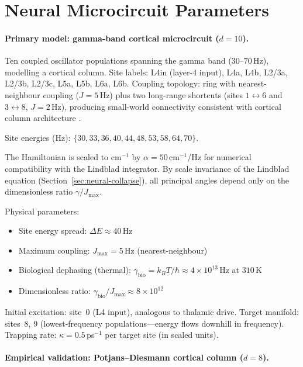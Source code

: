 \documentclass[12pt,a4paper]{article}
\theoremstyle{definition}
\theoremstyle{remark}
\begin{document}
\section{Neural Microcircuit Parameters}
\label{app:neural}

\paragraph{Primary model: gamma-band cortical microcircuit ($d = 10$).}

Ten coupled oscillator populations spanning the gamma band ($30$--$70$\,Hz), modelling a cortical column. Site labels: L4in (layer-4 input), L4a, L4b, L2/3a, L2/3b, L2/3c, L5a, L5b, L6a, L6b. Coupling topology: ring with nearest-neighbour coupling ($J = 5$\,Hz) plus two long-range shortcuts (sites $1 \leftrightarrow 6$ and $3 \leftrightarrow 8$, $J = 2$\,Hz), producing small-world connectivity consistent with cortical column architecture \cite{buzsaki2012mechanisms}.

Site energies (Hz): $\{30, 33, 36, 40, 44, 48, 53, 58, 64, 70\}$.

The Hamiltonian is scaled to cm$^{-1}$ by $\alpha = 50$\,cm$^{-1}$/Hz for numerical compatibility with the Lindblad integrator. By scale invariance of the Lindblad equation (Section~\ref{sec:neural-collapse}), all principal angles depend only on the dimensionless ratio $\gamma/J_{\max}$.

Physical parameters:
\begin{itemize}
\item Site energy spread: $\Delta E \approx 40$\,Hz
\item Maximum coupling: $J_{\max} = 5$\,Hz (nearest-neighbour)
\item Biological dephasing (thermal): $\gamma_{\mathrm{bio}} = k_BT/\hbar \approx 4 \times 10^{13}$\,Hz at $310$\,K
\item Dimensionless ratio: $\gamma_{\mathrm{bio}}/J_{\max} \approx 8 \times 10^{12}$
\end{itemize}

Initial excitation: site~0 (L4 input), analogous to thalamic drive. Target manifold: sites~8, 9 (lowest-frequency populations---energy flows downhill in frequency). Trapping rate: $\kappa = 0.5$\,ps$^{-1}$ per target site (in scaled units).

\paragraph{Empirical validation: Potjans--Diesmann cortical column ($d = 8$).}
\end{document}

